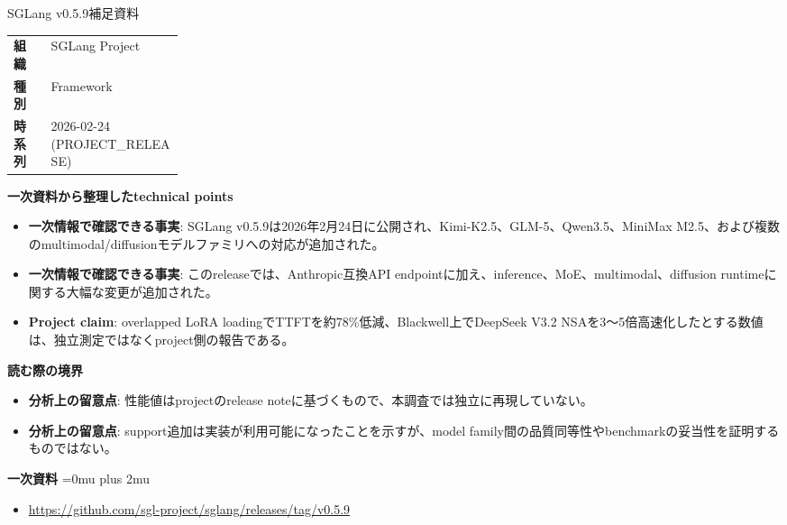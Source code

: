 \begin{technicalnote}{SGLang v0.5.9}{補足資料}
\begingroup
\begin{tabularx}{\linewidth}{@{}>{\bfseries}p{0.22\linewidth}X@{}}
組織 & SGLang Project \\
種別 & Framework \\
時系列 & 2026-02-24 (PROJECT\_RELEASE) \\
\end{tabularx}
\smallskip
{\bfseries 一次資料から整理したtechnical points}
\begin{itemize}[leftmargin=1.5em,itemsep=0.35em]
\item \textbf{一次情報で確認できる事実}: SGLang v0.5.9は2026年2月24日に公開され、Kimi-K2.5、GLM-5、Qwen3.5、MiniMax M2.5、および複数のmultimodal/diffusionモデルファミリへの対応が追加された。
\item \textbf{一次情報で確認できる事実}: このreleaseでは、Anthropic互換API endpointに加え、inference、MoE、multimodal、diffusion runtimeに関する大幅な変更が追加された。
\item \textbf{Project claim}: overlapped LoRA loadingでTTFTを約78\%低減、Blackwell上でDeepSeek V3.2 NSAを3〜5倍高速化したとする数値は、独立測定ではなくproject側の報告である。
\end{itemize}
\begin{minipage}{\linewidth}
{\bfseries 読む際の境界}
\begin{itemize}[leftmargin=1.5em,itemsep=0.35em]
\item \textbf{分析上の留意点}: 性能値はprojectのrelease noteに基づくもので、本調査では独立に再現していない。
\item \textbf{分析上の留意点}: support追加は実装が利用可能になったことを示すが、model family間の品質同等性やbenchmarkの妥当性を証明するものではない。
\end{itemize}
\begin{samepage}
{\bfseries 一次資料}
\begingroup\sloppy
\Urlmuskip=0mu plus 2mu\relax
\begin{itemize}[leftmargin=1.5em,itemsep=0.25em]
\item {\scriptsize\url{https://github.com/sgl-project/sglang/releases/tag/v0.5.9}}
\end{itemize}
\endgroup
\end{samepage}
\end{minipage}
\endgroup
\end{technicalnote}
\medskip

